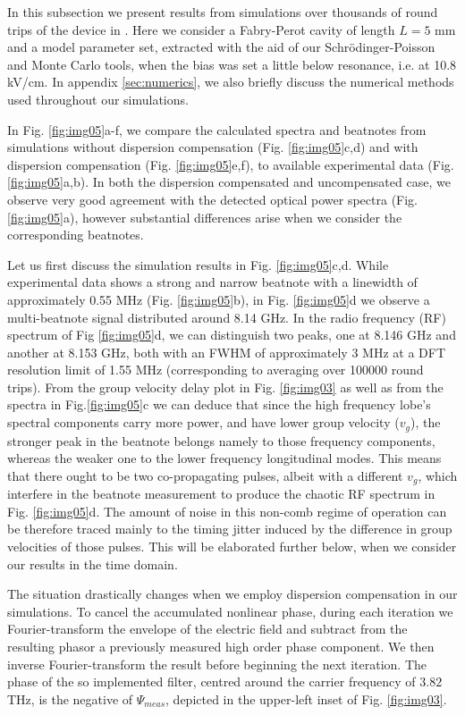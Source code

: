\documentclass[twocolumn,secnumarabic,amssymb, nobibnotes, aps, prd]{revtex4-1}
\begin{document}
{			In this subsection we present results from simulations over thousands of round trips of the device in \cite{burghoff2014terahertz}. Here we consider a Fabry-Perot cavity of length $L = 5 $ mm and a model parameter set, extracted with the aid of our Schr{\"o}dinger-Poisson and Monte Carlo tools, when the bias was set a little below resonance, i.e. at 10.8 kV/cm. In appendix \ref{sec:numerics}, we also briefly discuss the numerical methods used throughout our simulations.
			
			In Fig. \ref{fig:img05}a-f, we compare the calculated spectra and beatnotes from simulations without dispersion compensation (Fig. \ref{fig:img05}c,d) and with dispersion compensation (Fig. \ref{fig:img05}e,f), to available experimental data (Fig. \ref{fig:img05}a,b). In both the dispersion compensated and uncompensated case, we observe very good agreement with the detected optical power spectra (Fig. \ref{fig:img05}a), however substantial differences arise when we consider the corresponding beatnotes. 
			
			
			Let us first discuss the simulation results in Fig. \ref{fig:img05}c,d. While experimental data shows a strong and narrow beatnote with a linewidth of approximately 0.55 MHz (Fig. \ref{fig:img05}b), in  Fig. \ref{fig:img05}d we observe a multi-beatnote signal distributed around 8.14 GHz. In the radio frequency (RF) spectrum of Fig \ref{fig:img05}d, we can distinguish two peaks, one at 8.146 GHz and another at 8.153 GHz, both with an FWHM of approximately 3 MHz at a DFT resolution limit of 1.55 MHz (corresponding to averaging over 100000 round trips). From the group velocity delay plot in Fig. \ref{fig:img03} as well as from the spectra in Fig.\ref{fig:img05}c we can deduce that since the high frequency lobe's spectral components carry more power, and have lower group velocity ($v_g$), the stronger peak in the beatnote belongs namely to those frequency components, whereas the weaker one to the lower frequency longitudinal modes. This means that there ought to be two co-propagating pulses, albeit with a different $v_g$, which interfere in the beatnote measurement to produce the chaotic RF spectrum in Fig. \ref{fig:img05}d. The amount of noise in this non-comb regime of operation can be therefore traced mainly to the timing jitter induced by the difference in group velocities of those pulses. This will be elaborated further below, when we consider our results in the time domain. 
			
			The situation drastically changes when we employ dispersion compensation in our simulations. To cancel the accumulated nonlinear phase, during each iteration we Fourier-transform the envelope of the electric field and subtract from the resulting phasor a previously measured high order phase component. We then inverse Fourier-transform the result before beginning the next iteration. The phase of the so implemented filter, centred around the carrier frequency of $3.82$ THz, is the negative of $\Psi_{meas}$, depicted in the upper-left inset of Fig. \ref{fig:img03}. 
			
}
\end{document}
